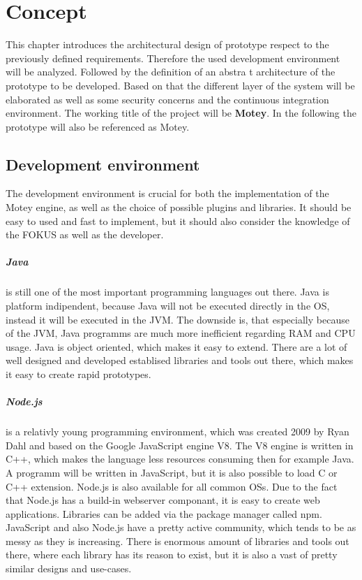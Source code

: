 \chapter{Concept}\label{chapter:concept}
This chapter introduces the architectural design of prototype respect to the previously defined requirements.
Therefore the used development environment will be analyzed.
Followed by the definition of an abstra t architecture of the prototype to be developed.
Based on that the different layer of the system will be elaborated as well as some security concerns and the continuous integration environment.
The working title of the project will be \textbf{Motey}.
In the following the prototype will also be referenced as Motey.

\section{Development environment}
The development environment is crucial for both the implementation of the Motey engine, as well as the choice of possible plugins and libraries.
It should be easy to used and fast to implement, but it should also consider the knowledge of the \ac{FOKUS} as well as the developer.

\paragraph{Java} is still one of the most important programming languages out there.\autocite[cf.]{ProgramminLanguage:2017}
Java is platform indipendent, because Java will not be executed directly in the \ac{OS}, instead it will be executed in the \ac{JVM}.
The downside is, that especially because of the \ac{JVM}, Java programms are much more inefficient regarding \ac{RAM} and \ac{CPU} usage.
Java is object oriented, which makes it easy to extend.
There are a lot of well designed and developed establised libraries and tools out there, which makes it easy to create rapid prototypes.

\paragraph{Node.js} is a relativly young programming environment, which was created 2009 by Ryan Dahl and based on the Google JavaScript engine V8.
The V8 engine is written in C++, which makes the language less resources consuming then for example Java.
A programm will be written in JavaScript, but it is also possible to load C or C++ extension.
Node.js is also available for all common \acp{OS}.
Due to the fact that Node.js has a build-in webserver componant, it is easy to create web applications.
Libraries can be added via the package manager called npm.
JavaScript and also Node.js have a pretty active community, which tends to be as messy as they is increasing.
There is enormous amount of libraries and tools out there, where each library has its reason to exist, but it is also a vast of pretty similar designs and use-cases.

